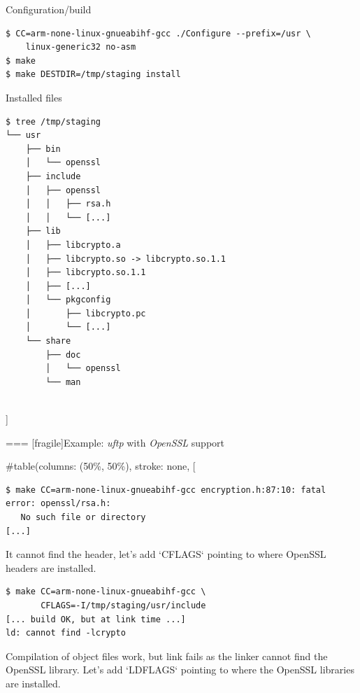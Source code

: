   \begin{block}{Configuration/build}
    {\tiny
\begin{verbatim}
$ CC=arm-none-linux-gnueabihf-gcc ./Configure --prefix=/usr \
    linux-generic32 no-asm
$ make
$ make DESTDIR=/tmp/staging install
\end{verbatim}
    }
  \end{block}
  \begin{block}{Installed files}
    {\tiny
\begin{verbatim}
$ tree /tmp/staging
└── usr
    ├── bin
    │   └── openssl
    ├── include
    │   ├── openssl
    │   │   ├── rsa.h
    │   │   └── [...]
    ├── lib
    │   ├── libcrypto.a
    │   ├── libcrypto.so -> libcrypto.so.1.1
    │   ├── libcrypto.so.1.1
    │   ├── [...]
    │   └── pkgconfig
    │       ├── libcrypto.pc
    │       └── [...]
    └── share
        ├── doc
        │   └── openssl
        └── man
\end{verbatim}
    }
  \end{block}
\\]


=== [fragile]{Example: {\em uftp} with {\em OpenSSL} support}
  
#table(columns: (50\%, 50\%), stroke: none,
[
  \begin{block}{}
    {\tiny
\begin{verbatim}
$ make CC=arm-none-linux-gnueabihf-gcc encryption.h:87:10: fatal error: openssl/rsa.h:
   No such file or directory
[...]
\end{verbatim}
    }
  \end{block}

  {\small It cannot find the header, let's add `CFLAGS` pointing
    to where OpenSSL headers are installed.}

  \begin{block}{}
    {\tiny
\begin{verbatim}
$ make CC=arm-none-linux-gnueabihf-gcc \
       CFLAGS=-I/tmp/staging/usr/include
[... build OK, but at link time ...]
ld: cannot find -lcrypto
\end{verbatim}
    }
  \end{block}

  {\small Compilation of object files work, but link fails as the
    linker cannot find the OpenSSL library. Let's add `LDFLAGS`
    pointing to where the OpenSSL libraries are installed.}


